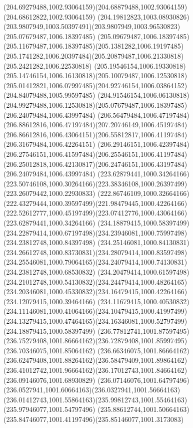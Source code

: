 {{\curveto(204.69279488,1002.93064159)(204.68879488,1002.93064159)(204.68612822,1002.93064159)
\curveto(204.19812823,1003.08930826)(203.9807949,1003.50397491)(203.9807949,1003.96530823)
\moveto(205.07679487,1006.18397485)
\curveto(205.09679487,1006.18397485)(205.11679487,1006.18397485)(205.1381282,1006.19197485)
\curveto(205.1741282,1006.20397484)(205.20879487,1006.21330818)(205.2421282,1006.22530818)
\curveto(205.19546154,1006.19330818)(205.14746154,1006.16130818)(205.10079487,1006.12530818)
\curveto(205.01412821,1006.07997485)(204.92746154,1006.03864152)(204.84079488,1005.99597485)
\curveto(204.91546154,1006.06130818)(204.99279488,1006.12530818)(205.07679487,1006.18397485)
\moveto(206.24079484,1006.43997484)
\curveto(206.56479484,1006.47197484)(206.88612816,1006.47197484)(207.20746149,1006.45197484)
\curveto(206.86612816,1006.43064151)(206.55812817,1006.41197484)(206.31679484,1006.42264151)
\curveto(206.29146151,1006.42397484)(206.27546151,1006.41597484)(206.25546151,1006.41197484)
\curveto(206.25012818,1006.42130817)(206.24746151,1006.43197484)(206.24079484,1006.43997484)
\moveto(223.62879441,1000.34264166)
\curveto(223.50746108,1000.30264166)(223.38346108,1000.26397499)(223.26079442,1000.22930833)
\curveto(222.86746109,1000.32664166)(222.43279444,1000.39597499)(221.98479445,1000.42264166)
\curveto(222.52612777,1000.45197499)(223.07412776,1000.43064166)(223.62879441,1000.34264166)
\moveto(234.18879415,1000.58397499)
\curveto(234.22879414,1000.67197498)(234.23946081,1000.75997498)(234.23812748,1000.84397498)
\curveto(234.25146081,1000.84130831)(234.26612748,1000.83730831)(234.28079414,1000.83597498)
\curveto(234.25546081,1000.79064165)(234.24079414,1000.74130831)(234.23812748,1000.68530832)
\curveto(234.20479414,1000.61597498)(234.21012748,1000.54130832)(234.24479414,1000.48264165)
\curveto(234.20346081,1000.45330832)(234.16479415,1000.42264166)(234.12079415,1000.39464166)
\curveto(234.11679415,1000.40530832)(234.11146081,1000.41064166)(234.10479415,1000.41997499)
\curveto(234.13279415,1000.47464165)(234.16346081,1000.52797499)(234.18879415,1000.58397499)
\moveto(236.77812741,1001.87597495)
\curveto(236.75279408,1001.86664162)(236.72879408,1001.85997495)(236.70346075,1001.85064162)
\curveto(236.66346075,1001.86664162)(236.62479408,1001.88264162)(236.58479409,1001.89864162)
\curveto(236.41012742,1001.96664162)(236.17012743,1001.84664162)(236.09146076,1001.68930829)
\curveto(236.07146076,1001.64797496)(236.0527941,1001.60664163)(236.0327941,1001.56664163)
\curveto(236.01412743,1001.55864163)(235.99812743,1001.55464163)(235.97946077,1001.54797496)
\curveto(235.88612744,1001.50664163)(235.84746077,1001.41197496)(235.85146077,1001.3173083)
}}
